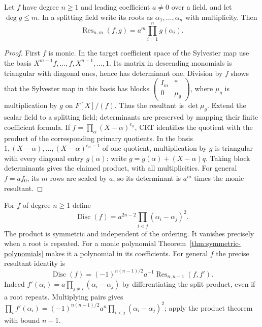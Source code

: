 \begin{theorem}\label{thm:resultant-product}
Let $f$ have degree $n\ge1$ and leading coefficient $a\ne0$ over
a field, and let $\deg g\le m$. In a splitting field write its
roots as $\alpha_1,\ldots,\alpha_n$ with multiplicity. Then
\[
 \operatorname{Res}_{n,m}(f,g)=a^m\prod_{i=1}^n g(\alpha_i).
\]
\end{theorem}
\begin{proof}
First $f$ is monic. In the target coefficient space of the
Sylvester map use the basis
$X^{m-1}f,\ldots,f,X^{n-1},\ldots,1$.
Its matrix in descending monomials is triangular with diagonal
ones, hence has determinant one. Division by $f$ shows that the
Sylvester map in this basis has blocks
$\begin{pmatrix}I_m&*\\0&\mu_g\end{pmatrix}$,
where $\mu_g$ is multiplication by $g$ on $F[X]/(f)$.
Thus the resultant is $\det\mu_g$.
Extend the scalar field to a splitting field; determinants are
preserved by mapping their finite coefficient formula.
If $f=\prod_\alpha(X-\alpha)^{e_\alpha}$, CRT identifies the
quotient with the product of the corresponding primary quotients.
In the basis $1,(X-\alpha),\ldots,(X-\alpha)^{e_\alpha-1}$
of one quotient, multiplication by $g$ is triangular with every
diagonal entry $g(\alpha)$: write
$g=g(\alpha)+(X-\alpha)q$. Taking block determinants gives the
claimed product, with all multiplicities.
For general $f=a f_0$, its $m$ rows are scaled by $a$, so its
determinant is $a^m$ times the monic resultant.
\end{proof}

For $f$ of degree $n\ge1$ define
\[
 \operatorname{Disc}(f)
 =a^{2n-2}\prod_{i<j}(\alpha_i-\alpha_j)^2.
\]
The product is symmetric and independent of the ordering. It
vanishes precisely when a root is repeated. For a monic polynomial
Theorem~\ref{thm:symmetric-polynomials} makes it a polynomial in
its coefficients. For general $f$ the precise resultant identity is
\begin{equation}\label{eq:discriminant-resultant}
 \operatorname{Disc}(f)=
 (-1)^{n(n-1)/2}a^{-1}\operatorname{Res}_{n,n-1}(f,f').
\end{equation}
Indeed $f'(\alpha_i)=a\prod_{j\ne i}(\alpha_i-\alpha_j)$
by differentiating the split product, even if a root repeats.
Multiplying pairs gives
$\prod_i f'(\alpha_i)=(-1)^{n(n-1)/2}a^n
\prod_{i<j}(\alpha_i-\alpha_j)^2$; apply the product theorem
with bound $n-1$.

